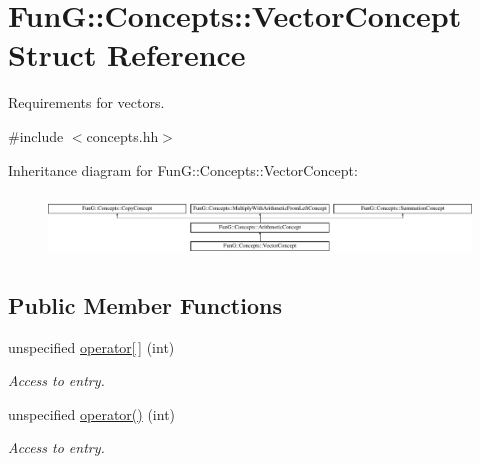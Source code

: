 \hypertarget{structFunG_1_1Concepts_1_1VectorConcept}{\section{Fun\-G\-:\-:Concepts\-:\-:Vector\-Concept Struct Reference}
\label{structFunG_1_1Concepts_1_1VectorConcept}
}


Requirements for vectors.  




{\ttfamily \#include $<$concepts.\-hh$>$}

Inheritance diagram for Fun\-G\-:\-:Concepts\-:\-:Vector\-Concept\-:\begin{figure}[H]
\begin{center}
\leavevmode
\includegraphics[height=1.661721cm]{structFunG_1_1Concepts_1_1VectorConcept}
\end{center}
\end{figure}
\subsection*{Public Member Functions}
\begin{DoxyCompactItemize}
\item 
\hypertarget{structFunG_1_1Concepts_1_1VectorConcept_a43c32ede7adc0131b68685ce5fe2bc66}{unspecified \hyperlink{structFunG_1_1Concepts_1_1VectorConcept_a43c32ede7adc0131b68685ce5fe2bc66}{operator\mbox{[}$\,$\mbox{]}} (int)}\label{structFunG_1_1Concepts_1_1VectorConcept_a43c32ede7adc0131b68685ce5fe2bc66}

\begin{DoxyCompactList}\small\item\em Access to entry. \end{DoxyCompactList}\item 
\hypertarget{structFunG_1_1Concepts_1_1VectorConcept_a01dc6bda9b67aeaf1e18bfd38749d51c}{unspecified \hyperlink{structFunG_1_1Concepts_1_1VectorConcept_a01dc6bda9b67aeaf1e18bfd38749d51c}{operator()} (int)}\label{structFunG_1_1Concepts_1_1VectorConcept_a01dc6bda9b67aeaf1e18bfd38749d51c}

\begin{DoxyCompactList}\small\item\em Access to entry. \end{DoxyCompactList}\end{DoxyCompactItemize}


